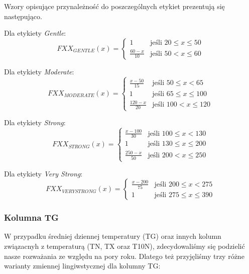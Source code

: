 \documentclass{classrep}
\begin{document}
Wzory opisujące przynależność do poszczególnych etykiet prezentują się następująco. \newline

Dla etykiety \textit{Gentle}:
\begin{equation}
{FXX}_{GENTLE}(x)= \left\{ \begin{array}{ll}
1 			& \textrm{jeśli $20 \leq x \leq 50$} \\
\frac{60-x}{10} 	& \textrm{jeśli $50 < x \leq 60$}
\end{array} \right.
\end{equation}

Dla etykiety \textit{Moderate}:
\begin{equation}
{FXX}_{MODERATE}(x)= \left\{ \begin{array}{ll}
\frac{x-50}{15} 	& \textrm{jeśli $50 \leq x < 65$} \\
1 			& \textrm{jeśli $65 \leq x \leq 100$} \\
\frac{120-x}{20} 	& \textrm{jeśli $100 < x \leq 120$}
\end{array} \right.
\end{equation}

Dla etykiety \textit{Strong}:
\begin{equation}
{FXX}_{STRONG}(x)= \left\{ \begin{array}{ll}
\frac{x-100}{30} 	& \textrm{jeśli $100 \leq x < 130$} \\
1 			& \textrm{jeśli $130 \leq x \leq 200$} \\
\frac{250-x}{50} 	& \textrm{jeśli $200 < x \leq 250$}
\end{array} \right.
\end{equation}

Dla etykiety \textit{Very Strong}:
\begin{equation}
{FXX}_{VERYSTRONG}(x)= \left\{ \begin{array}{ll}
\frac{x-200}{75} 	 & \textrm{jeśli $200 \leq x < 275$} \\
1 			 & \textrm{jeśli $275 \leq x \leq 390$}
\end{array} \right.
\end{equation}

\clearpage



\subsubsection{Kolumna TG}
W przypadku średniej dziennej temperatury (TG) oraz innych kolumn związacnyh z temperaturą (TN, TX oraz T10N), zdecydowaliśmy się podzielić nasze rozważania ze względu na pory roku. Dlatego też przyjęliśmy trzy różne warianty zmiennej lingiwstycznej dla kolumny TG:
\end{document}
